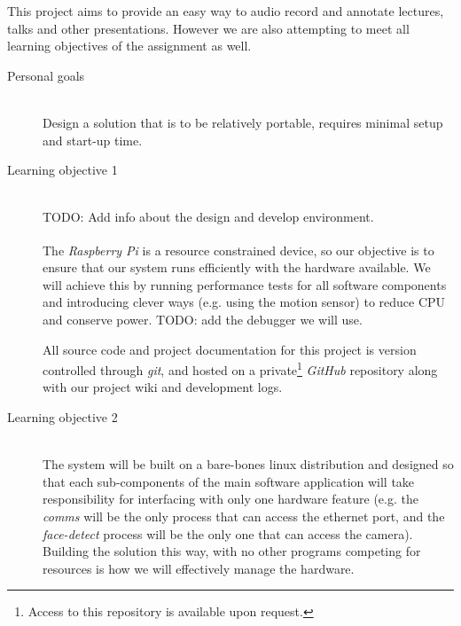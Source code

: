 \documentclass[11pt,a4paper,titlepage]{report}
\newcommand{\rpi}{\textit{Raspberry Pi\textsuperscript{\textregistered}}}
\begin{document}
This project aims to provide an easy way to audio record and annotate lectures, talks and other presentations. However we are also attempting to meet all learning objectives of the assignment as well.

\begin{description}
   
  \item[Personal goals] \hfill \\
      Design a solution that is to be relatively portable, requires minimal setup and start-up time. 
      
  \item[Learning objective 1] \hfill \\
  {\color{red} TODO: Add info about the design and develop environment.}

The \rpi\xspace is a resource constrained device, so our objective is to ensure that our system runs efficiently with the hardware available. We will achieve this by running performance tests for all software components and introducing clever ways (e.g. using the motion sensor) to reduce CPU and conserve power. {\color{red} TODO: add the debugger we will use.}

All source code and project documentation for this project is version controlled through \textit{git}, and hosted on a private\footnote{Access to this repository is available upon request.} \textit{GitHub} repository along with our project wiki and development logs.

  \item[Learning objective 2] \hfill \\
The system will be built on a bare-bones linux distribution and designed so that each sub-components of the main software application will take responsibility for interfacing with only one hardware feature (e.g. the \textit{comms} will be the only process that can access the ethernet port, and the \textit{face-detect} process will be the only one that can access the camera). Building the solution this way, with no other programs competing for resources is how we will effectively manage the hardware.


\end{description}
\end{document}
